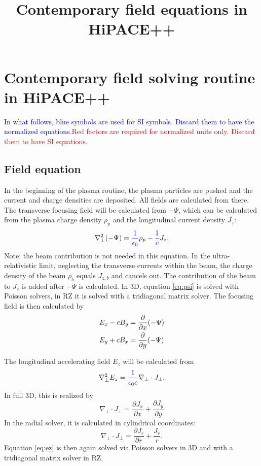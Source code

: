 \documentclass{article}
\title{Contemporary field equations in HiPACE++}
\begin{document}
\section*{Contemporary field solving routine in HiPACE++}
\label{se:pic_rad_field_solver}

\newcommand{\blue}[1]{\textcolor{blue}{#1}}
\newcommand{\red}[1]{\textcolor{red}{#1}}

\blue{In what follows, blue symbols are used for SI symbols. Discard them to have the normalized equations.}\red{Red factors are required for normalized units only. Discard them to have SI equations.}

\subsection*{Field equation}

In the beginning of the plasma routine, the plasma particles are pushed and the current and charge densities are deposited. All fields are calculated from there.
The transverse focusing field will be calculated from $-\Psi$, which can be calculated from the plasma charge density $\rho_p$ and the longitudinal current density $J_z$:
\begin{equation}
\nabla^2_{\perp} (- \Psi)  = \blue{\frac{1}{\epsilon_0}}\rho_p - \blue{\frac{1}{c}}J_z .
\label{eq:psi}
\end{equation}
Note: the beam contribution is not needed in this equation. In the ultra-relativistic limit, neglecting the transverse currents within the beam, the charge density of the beam $\rho_b$ equals $J_{z,b}$ and cancels out. The contribution of the beam to $J_z$ is added after $-\Psi$ is calculated.
In 3D, equation \ref{eq:psi} is solved with Poisson solvers, in RZ it is solved with a tridiagonal matrix solver.
The focusing field is then calculated by
\begin{subequations}
\begin{align}
    E_x - \blue{c}B_y &= \frac{\partial}{\partial x} (-\Psi) \\
    E_y + \blue{c}B_x &= \frac{\partial}{\partial y} (-\Psi)
\end{align}
\end{subequations}


The longitudinal accelerating field $E_z$ will be calculated from
\begin{equation} \label{eq:ez}
\nabla^2_{\perp} E_z = \blue{\frac{1}{\epsilon_0 c}} \nabla_{\perp} \cdot  J_{\perp} .
\end{equation}
In full 3D, this is realized by
\begin{equation}
    \nabla_{\perp} \cdot J_{\perp} = \frac{\partial J_x}{\partial x} +  \frac{\partial J_y}{\partial y}
\end{equation}
In the radial solver, it is calculated in cylindrical coordinates:
\begin{equation}
    \nabla_{\perp} \cdot J_{\perp} = \frac{\partial J_r}{\partial r} + \frac{J_r}{r}.
\end{equation}
Equation \ref{eq:ez} is then again solved via Poisson solvers in 3D and with a tridiagonal matrix solver in RZ.
\end{document}
